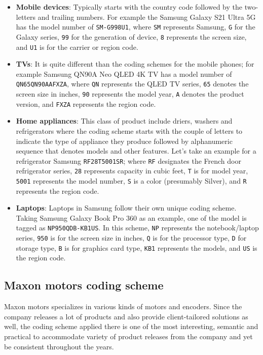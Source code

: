 \begin{itemize}
    \item \textbf{Mobile devices}: Typically starts with the country code followed by the two-letters and trailing numbers. For example the Samsung Galaxy S21 Ultra 5G has the model number of \texttt{SM-G998U1}, where \texttt{SM} represents Samsung, \texttt{G} for the Galaxy series, \texttt{99} for the generation of device, \texttt{8} represents the screen size, and \texttt{U1} is for the carrier or region code.

    \item \textbf{TVs}: It is quite different than the coding schemes for the mobile phones; for example Samsung QN90A Neo QLED 4K TV has a model number of \texttt{QN65QN90AAFXZA}, where \texttt{QN} represents the QLED TV series, \texttt{65} denotes the screen size in inches, \texttt{90} represents the model year, \texttt{A} denotes the product version, and \texttt{FXZA} represents the region code.

    \item \textbf{Home appliances}: This class of product include driers, washers and refrigerators where the coding scheme starts with the couple of letters to indicate the type of appliance they produce followed by alphanumeric sequence that denotes models and other features. Let's take an example for a refrigerator Samsung \texttt{RF28T5001SR}; where \texttt{RF} designates the French door refrigerator series, \texttt{28} represents capacity in cubic feet, \texttt{T} is for model year, \texttt{5001} represents the model number, \texttt{S} is a color (presumably Silver), and \texttt{R} represents the region code.

    \item \textbf{Laptops}: Laptops in Samsung follow their own unique coding scheme. Taking Samsung Galaxy Book Pro 360 as an example, one of the model is tagged as \texttt{NP950QDB-KB1US}. In this scheme, \texttt{NP} represents the notebook/laptop series, \texttt{950} is for the screen size in inches, \texttt{Q} is for the processor type, \texttt{D} for storage type, \texttt{B} is for graphics card type, \texttt{KB1} represents the models, and \texttt{US} is the region code.
\end{itemize}


\subsection{Maxon motors coding scheme}

Maxon motors specializes in various kinds of motors and encoders. Since the company releases a lot of products and also provide client-tailored solutions as well, the coding scheme applied there is one of the most interesting, semantic and practical to accommodate variety of product releases from the company and yet be consistent throughout the years.

